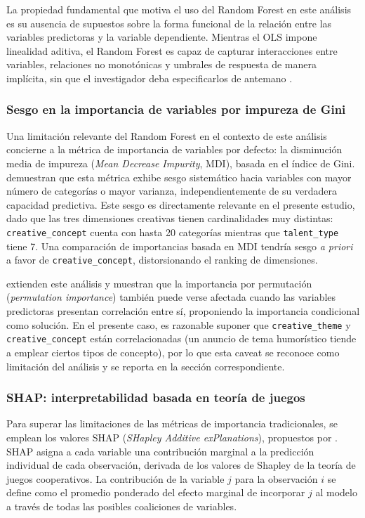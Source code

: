 \documentclass[12pt, a4paper]{report}
\begin{document}
La propiedad fundamental que motiva el uso del Random Forest en este análisis es su
ausencia de supuestos sobre la forma funcional de la relación entre las variables
predictoras y la variable dependiente. Mientras el OLS impone linealidad aditiva,
el Random Forest es capaz de capturar interacciones entre variables, relaciones no
monotónicas y umbrales de respuesta de manera implícita, sin que el investigador
deba especificarlos de antemano \citep[Cap.~15]{hastie2009}.

\subsubsection*{Sesgo en la importancia de variables por impureza de Gini}

Una limitación relevante del Random Forest en el contexto de este análisis concierne
a la métrica de importancia de variables por defecto: la disminución media de impureza
(\textit{Mean Decrease Impurity}, MDI), basada en el índice de Gini. \citet{strobl2007}
demuestran que esta métrica exhibe sesgo sistemático hacia variables con mayor número
de categorías o mayor varianza, independientemente de su verdadera capacidad predictiva.
Este sesgo es directamente relevante en el presente estudio, dado que las tres dimensiones
creativas tienen cardinalidades muy distintas: \texttt{creative\_concept} cuenta con
hasta 20 categorías mientras que \texttt{talent\_type} tiene 7. Una comparación de
importancias basada en MDI tendría sesgo \textit{a priori} a favor de \texttt{creative\_concept},
distorsionando el ranking de dimensiones.

\citet{strobl2008} extienden este análisis y muestran que la importancia por permutación
(\textit{permutation importance}) también puede verse afectada cuando las variables
predictoras presentan correlación entre sí, proponiendo la importancia condicional
como solución. En el presente caso, es razonable suponer que \texttt{creative\_theme}
y \texttt{creative\_concept} están correlacionadas (un anuncio de tema humorístico
tiende a emplear ciertos tipos de concepto), por lo que esta caveat se reconoce
como limitación del análisis y se reporta en la sección correspondiente.

\subsubsection*{SHAP: interpretabilidad basada en teoría de juegos}

Para superar las limitaciones de las métricas de importancia tradicionales,
se emplean los valores SHAP (\textit{SHapley Additive exPlanations}), propuestos
por \citet{lundberg2017}. SHAP asigna a cada variable una contribución marginal
a la predicción individual de cada observación, derivada de los valores de Shapley
de la teoría de juegos cooperativos. La contribución de la variable $j$ para la
observación $i$ se define como el promedio ponderado del efecto marginal de incorporar
$j$ al modelo a través de todas las posibles coaliciones de variables.
\end{document}
